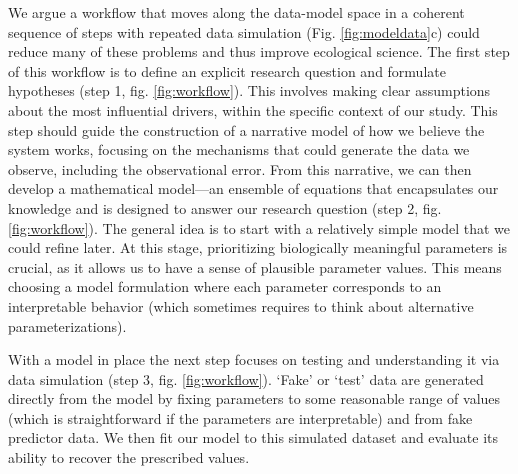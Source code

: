 \documentclass[11pt]{article}
\begin{document}
We argue a workflow that moves along the data-model space in a coherent sequence of steps with repeated data simulation %
(Fig. \ref{fig:modeldata}c) could reduce many of these problems and thus improve ecological science.
The first step of this workflow is to define an explicit research question and formulate hypotheses (step 1, fig. \ref{fig:workflow}). This involves making clear assumptions about the most influential drivers, within the specific context of our study. This step should guide the construction of a narrative model of how we believe the system works, focusing on the mechanisms that could generate the data we observe, including the observational error. %
From this narrative, we can then develop a mathematical model---an ensemble of equations that encapsulates our knowledge and is designed to answer our research question (step 2, fig. \ref{fig:workflow}). The general idea is to start with a relatively simple model that we could refine later. At this stage, prioritizing biologically meaningful parameters is crucial, as it allows us to have a sense of plausible parameter values. This means choosing a model formulation where each parameter corresponds to an interpretable behavior (which sometimes requires to think about alternative parameterizations).

With a model in place the next step focuses on testing and understanding it via data simulation (step 3, fig. \ref{fig:workflow}). `Fake' or `test' data are generated directly from the model by fixing parameters to some reasonable range of values (which is straightforward if the parameters are interpretable) and from fake predictor data. %
We then fit our model to this simulated dataset and evaluate its ability to recover the prescribed values. 
\end{document}
